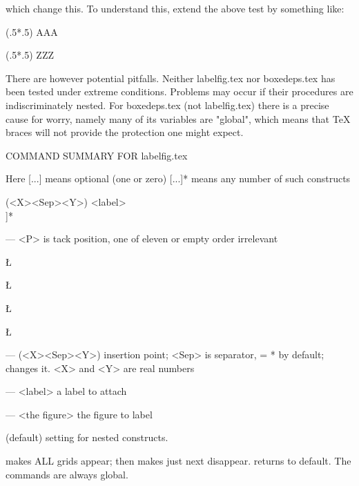 which change this.  To understand this, extend the above test 
by something like:


 \LabelsLocal

 \SetLabels
    (.5*.5) AAA\\
 \endSetLabels

 {%
 \SetLabels
    (.5*.5) ZZZ\\
 \endSetLabels
   \AffixLabels{\FirstQuadrant}
 }

   \AffixLabels{\FirstQuadrant}


     There are however potential pitfalls.  Neither
labelfig.tex nor boxedeps.tex has been tested under extreme
conditions. Problems may occur if their procedures are
indiscriminately nested. For boxedeps.tex (not labelfig.tex)
there is a precise cause for worry, namely many of its
variables are "global", which means that TeX braces will not
provide the protection one might expect.
 

COMMAND SUMMARY FOR labelfig.tex

  Here [...] means optional (one or zero)
       [...]* means any number of such constructs

  \SetLabels
    [[<P>](<X><Sep><Y>) <label> \\]*
  \endSetLabels
  \ShowGrid  %

   --- <P> is tack position, one of eleven or empty
              order irrelevant

                   \L\T      \T      \R\T

                   \L\E      \E      \R\E

                     \L               \R

                   \L\B      \B      \R\B

   --- (<X><Sep><Y>) insertion point;
  <Sep> is separator, = * by default;
   changes it.
   <X> and <Y> are real numbers

  --- <label> a label to attach 

  --- <the figure> the figure to label 

  \GlobalLabels (default)     
  \LocalLabels  setting for nested constructs.

 \Grids makes ALL grids appear; \HideGrid then makes just next disappear.
 \noGrids returns to default.  The commands are always global.

